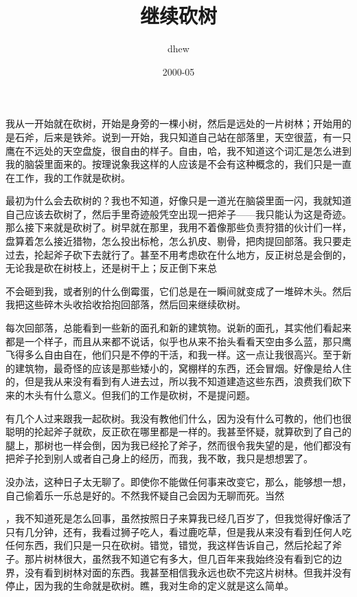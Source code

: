 \documentclass{article}
\title{继续砍树}
\author{dhew}
\date{2000-05}
\begin{document}

\maketitle


\Large

﻿我从一开始就在砍树，开始是身旁的一棵小树，然后是远处的一片树林；开始用的是石斧，后来是铁斧。说到一开始，我只知道自己站在部落里，天空很蓝，有一只鹰在不远处的天空盘旋，很自由的样子。自由，哈，我不知道这个词汇是怎么进到我的脑袋里面来的。按理说象我这样的人应该是不会有这种概念的，我们只是一直在工作，我的工作就是砍树。


最初为什么会去砍树的？我也不知道，好像只是一道光在脑袋里面一闪，我就知道自己应该去砍树了，然后手里奇迹般凭空出现一把斧子——我只能认为这是奇迹。那么接下来就是砍树了。树早就在那里，我用不着像那些负责狩猎的伙计们一样，盘算着怎么接近猎物，怎么投出标枪，怎么扒皮、剔骨，把肉提回部落。我只要走过去，抡起斧子砍下去就行了。甚至不用考虑砍在什么地方，反正树总是会倒的，无论我是砍在树枝上，还是树干上；反正倒下来总

\newpage 

不会砸到我，或者别的什么倒霉蛋，它们总是在一瞬间就变成了一堆碎木头。然后我把这些碎木头收拾收拾抱回部落，然后回来继续砍树。

每次回部落，总能看到一些新的面孔和新的建筑物。说新的面孔，其实他们看起来都是一个样子，而且从来都不说话，似乎也从来不抬头看看天空由多么蓝，那只鹰飞得多么自由自在，他们只是不停的干活，和我一样。这一点让我很高兴。至于新的建筑物，最奇怪的应该是那些矮小的，窝棚样的东西，还会冒烟。好像是给人住的，但是我从来没有看到有人进去过，所以我不知道建造这些东西，浪费我们砍下来的木头有什么意义。但我们的工作是砍树，不是提问题。


有几个人过来跟我一起砍树。我没有教他们什么，因为没有什么可教的，他们也很聪明的抡起斧子就砍，反正砍在哪里都是一样的。我甚至怀疑，就算砍到了自己的腿上，那树也一样会倒，因为我已经抡了斧子，然而很令我失望的是，他们都没有把斧子抡到别人或者自己身上的经历，而我，我不敢，我只是想想罢了。

没办法，这种日子太无聊了。即使你不能做任何事来改变它，那么，能够想一想，自己偷着乐一乐总是好的。不然我怀疑自己会因为无聊而死。当然

\newpage 

，我不知道死是怎么回事，虽然按照日子来算我已经几百岁了，但我觉得好像活了只有几分钟，还有，我看过狮子吃人，看过鹿吃草，但是我从来没有看到任何人吃任何东西，我们只是一只在砍树。错觉，错觉，我这样告诉自己，然后抡起了斧子。那片树林很大，虽然我不知道它有多大，但几百年来我始终没有看到它的边界，没有看到树林对面的东西。我甚至相信我永远也砍不完这片树林。但我并没有停止，因为我的生命就是砍树。瞧，我对生命的定义就是这么简单。
\end{document}
